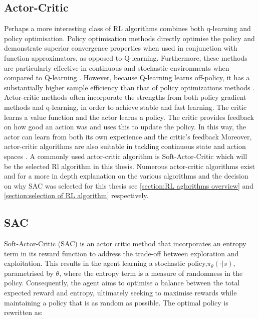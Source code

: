 \subsection{Actor-Critic}\label{ssection:actor-critic}
Perhaps a more interesting class of RL algorithms combines both q-learning and policy optimisation. Policy optimisation methods directly optimise the policy and demonstrate superior convergence properties when used in conjunction with function approximators, as opposed to Q-learning. Furthermore, these methods are particularly effective in continuous and stochastic environments when compared to Q-learning \cite{suttonReinforcementLearningIntroduction2014}. However, because Q-learning learns off-policy, it has a substantially higher sample efficiency than that of policy optimizations methods \cite{suttonReinforcementLearningIntroduction2014}.
Actor-critic methods often incorporate the strengths from both policy gradient methods and q-learning, in order to achieve stable and fast learning. The critic learns a value function and the actor learns a policy. The critic provides feedback on how good an action was and uses this to update the policy. In this way, the actor can learn from both its own experience and the critic's feedback 
Moreover, actor-critic algorithms are also suitable in tackling continuous state and action spaces \cite{suttonReinforcementLearningIntroduction2014}. A commonly used actor-critic algorithm  is Soft-Actor-Critic which will be the selected Rl algorithm in this thesis. Numerous actor-critic algorithms exist and for a more in depth explanation on the various algorithms and the decision on why SAC was selected  for this thesis see \autoref{section:RL aglorithms overview} and \autoref{section:selection of RL algorithm} respectively.

\subsection{SAC}
Soft-Actor-Critic (SAC) is an actor critic method that incorporates an entropy term in its reward function to address the trade-off between exploration and exploitation. This results in the agent learning a stochastic policy,$\pi_{\theta}(\cdot|s)$, parametrised by $\theta$, where the entropy term is a measure of randomness in the policy. Consequently, the agent aims to optimise a balance between the total expected reward and entropy, ultimately seeking to maximise rewards while maintaining a policy that is as random as possible. The optimal policy is rewritten as:

